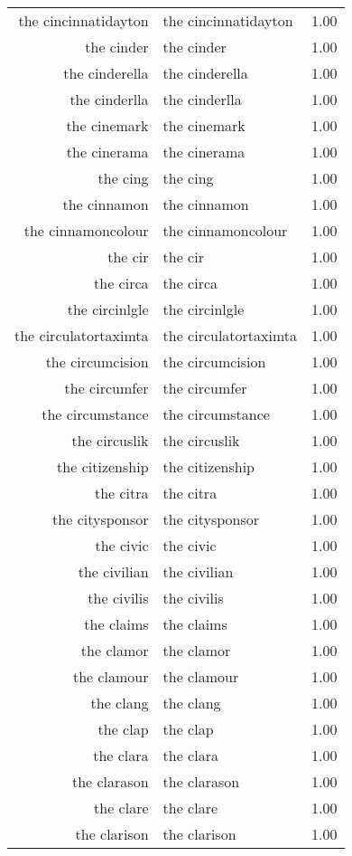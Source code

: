 \begin{table}[ht]
\begin{tabular}{rlr}
  the cincinnatidayton & the cincinnatidayton & 1.00 \\ 
  the cinder & the cinder & 1.00 \\ 
  the cinderella & the cinderella & 1.00 \\ 
  the cinderlla & the cinderlla & 1.00 \\ 
  the cinemark & the cinemark & 1.00 \\ 
  the cinerama & the cinerama & 1.00 \\ 
  the cing & the cing & 1.00 \\ 
  the cinnamon & the cinnamon & 1.00 \\ 
  the cinnamoncolour & the cinnamoncolour & 1.00 \\ 
  the cir & the cir & 1.00 \\ 
  the circa & the circa & 1.00 \\ 
  the circinlgle & the circinlgle & 1.00 \\ 
  the circulatortaximta & the circulatortaximta & 1.00 \\ 
  the circumcision & the circumcision & 1.00 \\ 
  the circumfer & the circumfer & 1.00 \\ 
  the circumstance & the circumstance & 1.00 \\ 
  the circuslik & the circuslik & 1.00 \\ 
  the citizenship & the citizenship & 1.00 \\ 
  the citra & the citra & 1.00 \\ 
  the citysponsor & the citysponsor & 1.00 \\ 
  the civic & the civic & 1.00 \\ 
  the civilian & the civilian & 1.00 \\ 
  the civilis & the civilis & 1.00 \\ 
  the claims & the claims & 1.00 \\ 
  the clamor & the clamor & 1.00 \\ 
  the clamour & the clamour & 1.00 \\ 
  the clang & the clang & 1.00 \\ 
  the clap & the clap & 1.00 \\ 
  the clara & the clara & 1.00 \\ 
  the clarason & the clarason & 1.00 \\ 
  the clare & the clare & 1.00 \\ 
  the clarison & the clarison & 1.00 \\ 

\end{tabular}
\end{table}
